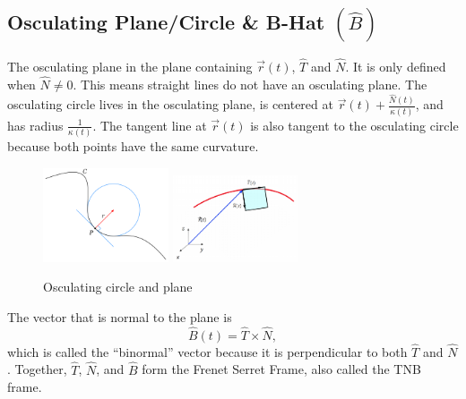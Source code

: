 \subsection{Osculating Plane/Circle \& B-Hat $\left(\hat{B}\right)$}
\noindent
The osculating plane in the plane containing $\vec{r}(t)$, $\hat{T}$ and $\hat{N}$. It is only defined when $\hat{N}\neq 0$. This means straight lines do not have an osculating plane.
The osculating circle lives in the osculating plane, is centered at $\vec{r}(t) + \frac{\hat{N}(t)}{\kappa(t)}$, and has radius $\frac{1}{\kappa(t)}$.
The tangent line at $\vec{r}(t)$ is also tangent to the osculating circle because both points have the same curvature.

\begin{figure}[H]
	\label{osculating_plane_circle}
	\centering
	\includegraphics[width = 0.33\textwidth]{./vectorValuedFunctions/osculatingCircle.png}
	\includegraphics[width = 0.33\textwidth]{./vectorValuedFunctions/osculatingPlane.png}
	\caption{Osculating circle and plane}
\end{figure}

\noindent
The vector that is normal to the plane is 
\begin{equation*}
	\hat{B}(t) = \hat{T}\times\hat{N},
\end{equation*}
which is called the ``binormal'' vector because it is perpendicular to both $\hat{T}$ and $\hat{N}$.
Together, $\hat{T}$, $\hat{N}$, and $\hat{B}$ form the Frenet Serret Frame, also called the TNB frame.

